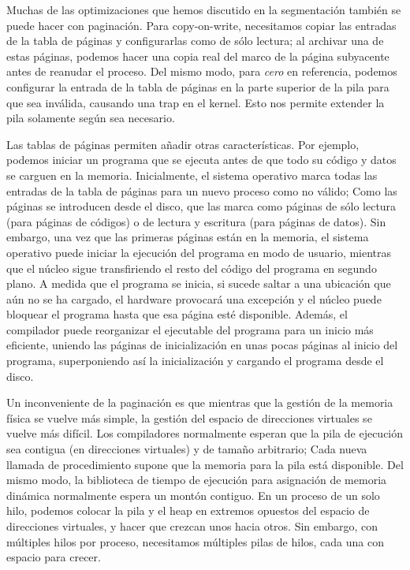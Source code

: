 \documentclass[10pt]{book}
\begin{document}
Muchas de las optimizaciones que hemos discutido en la segmentación también se puede hacer con paginación. Para copy-on-write, necesitamos copiar las entradas de la tabla de páginas y configurarlas como de sólo lectura; al archivar una de estas páginas, podemos hacer una copia real del marco de la página subyacente antes de reanudar el proceso. Del mismo modo, para \textit{cero} en referencia, podemos configurar la entrada de la tabla de páginas en la parte superior de la pila para que sea inválida, causando una trap en el kernel. Esto nos permite extender la pila solamente según sea necesario.

Las tablas de páginas permiten añadir otras características. Por ejemplo, podemos iniciar un programa que se ejecuta antes de que todo su código y datos se carguen en la memoria. Inicialmente, el sistema operativo marca todas las entradas de la tabla de páginas para un nuevo proceso como no válido; Como las páginas se introducen desde el disco, que las marca como páginas de sólo lectura (para páginas de códigos) o de lectura y escritura (para páginas de datos). Sin embargo, una vez que las primeras páginas están en la memoria, el sistema operativo puede iniciar la ejecución del programa en modo de usuario, mientras que el núcleo sigue transfiriendo el resto del código del programa en segundo plano. A medida que el programa se inicia, si sucede saltar a una ubicación que aún no se ha cargado, el hardware provocará una excepción y el núcleo puede bloquear el programa hasta que esa página esté disponible. Además, el compilador puede reorganizar el ejecutable del programa para un inicio más eficiente, uniendo las páginas de inicialización en unas pocas páginas al inicio del programa, superponiendo así la inicialización y cargando el programa desde el disco.

Un inconveniente de la paginación es que mientras que la gestión de la memoria física se vuelve más simple, la gestión del espacio de direcciones virtuales se vuelve más difícil. Los compiladores normalmente esperan que la pila de ejecución sea contigua (en direcciones virtuales) y de tamaño arbitrario; Cada nueva llamada de procedimiento supone que la memoria para la pila está disponible. Del mismo modo, la biblioteca de tiempo de ejecución para asignación de memoria dinámica normalmente espera un montón contiguo. En un proceso de un solo hilo, podemos colocar la pila y el heap en extremos opuestos del espacio de direcciones virtuales, y hacer que crezcan unos hacia otros. Sin embargo, con múltiples hilos por proceso, necesitamos múltiples pilas de hilos, cada una con espacio para crecer.
\end{document}
